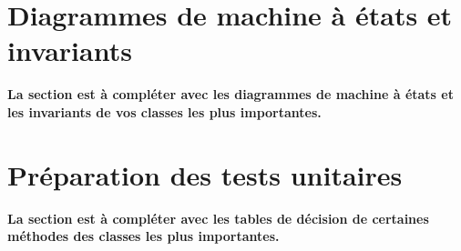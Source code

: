 \documentclass[11pt,article]{article}
\begin{document}
\newpage

\section{Diagrammes de machine à états et invariants}

{\color{red}\textbf{La section est à compléter avec les diagrammes de
    machine à états et les invariants de vos classes les plus
    importantes.}}

\newpage

\section{Préparation des tests unitaires}

{\color{red}\textbf{La section est à compléter avec les tables de
    décision de certaines méthodes des classes les plus importantes.}}
\end{document}
